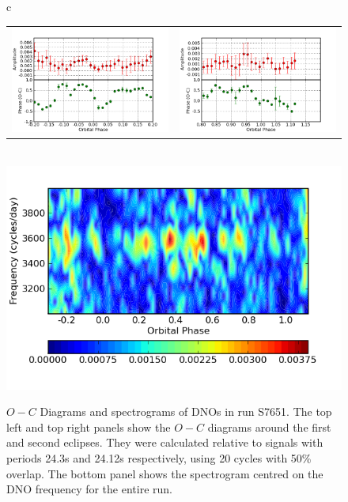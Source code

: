 \begin{figure}[t]
\begin{narrow}{-1in}{0in}
\begin{tabular}{c}
    \begin{tabular}{cc}
    \includegraphics[width=0.65\columnwidth, bb=0 0 600 400]{images/august_phot/S7651/S7651_24.30.png} &
    \includegraphics[width=0.65\columnwidth, bb=0 0 600 400]{images/august_phot/S7651/S7651_24.12.fixed.png}
    \end{tabular} \\
    \includegraphics[width=0.65\columnwidth, bb=0 0 600 400]{images/august_phot/S7651/S7651_trailed_ft.png} 
\end{tabular}
\end{narrow}
\caption[$O-C$ Diagrams and spectrograms of DNO in run S7651]{$O-C$ Diagrams and spectrograms of DNOs in run S7651. The top left and top right panels show the $O-C$ diagrams around the first and second eclipses. They were calculated relative to signals with periods 24.3s and 24.12s respectively, using 20 cycles with 50\% overlap. The bottom panel shows the spectrogram centred on the DNO frequency for the entire run.}
\label{S7651_DNO}
\end{figure}


